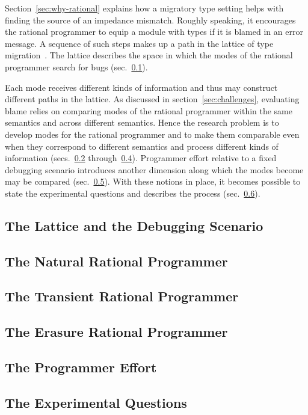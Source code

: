 
Section~\ref{sec:why-rational} explains how a migratory type setting helps with
finding the source of an impedance mismatch. Roughly speaking, it encourages the
rational programmer to equip a module with types if it is blamed in an error
message. A sequence of such steps makes up a path in the
lattice of type migration~\citep{tfgnvf-popl-2016}. The lattice describes the
space in which the modes of the rational programmer search for bugs
(sec.~\ref{sub:stuff}).

Each mode receives different kinds of information and thus may construct
different paths in the lattice. As discussed in section~\ref{sec:challenges},
evaluating blame relies on comparing modes of the rational programmer
within the same semantics and across different semantics.  
Hence the research problem is to develop modes for the rational programmer and to make
them comparable even when they correspond to different semantics and process
different kinds of information (secs.~\ref{sub:natural}
through~\ref{sub:erasure}). Programmer effort relative to a fixed debugging
scenario introduces another dimension along which the modes become may be
compared (sec.~\ref{sub:effort}). With these notions in place, it
becomes possible to state the experimental questions and describes the process (sec.~\ref{sub:experiment}).

\def\rsub#1#2{\subsection{#2} \label{sub:#1} }

\rsub{stuff}     {The Lattice and the Debugging Scenario} 
\rsub{natural}   {The Natural Rational Programmer} 
\rsub{transient} {The Transient Rational Programmer} 
\rsub{erasure}   {The Erasure Rational Programmer} 
\rsub{effort}    {The Programmer Effort} \label{subsec:effort}
\rsub{experiment}{The Experimental Questions} 
